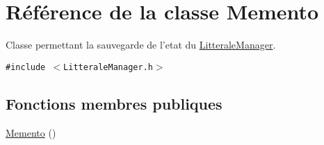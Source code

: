\hypertarget{class_memento}{
\section{Référence de la classe Memento}
\label{class_memento}
}
Classe permettant la sauvegarde de l'etat du \hyperlink{class_litterale_manager}{LitteraleManager}.  


{\tt \#include $<$LitteraleManager.h$>$}

\subsection*{Fonctions membres publiques}
\begin{CompactItemize}
\item 
\hypertarget{class_memento_3e8200cf33e67852fca5d671eed7f683}{
\hyperlink{class_memento_3e8200cf33e67852fca5d671eed7f683}{Memento} ()}
\label{class_memento_3e8200cf33e67852fca5d671eed7f683}


\end{CompactItemize}
